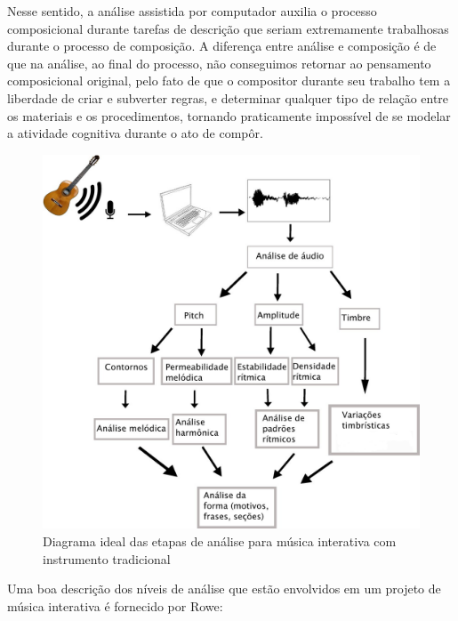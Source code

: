 \documentclass{ppgmus}
\begin{document}

Nesse sentido, a análise assistida por computador auxilia
o processo composicional durante tarefas de descrição que seriam
extremamente trabalhosas durante o processo de composição.
A diferença entre análise e composição é de que na análise, ao final do
processo, não conseguimos retornar ao pensamento composicional
original, pelo fato de que o compositor durante seu trabalho tem a 
liberdade de criar e subverter regras, e determinar qualquer tipo de relação
entre os materiais e os procedimentos, tornando praticamente impossível
de se modelar a atividade cognitiva durante o ato de compôr.

\begin{figure}
\includegraphics[scale=.9]{analise}
\caption{Diagrama ideal das etapas de análise para música interativa com instrumento tradicional}
\label{analise-geral}
\end{figure} 

Uma boa descrição dos níveis de análise que estão envolvidos em um projeto
de música interativa é fornecido por Rowe:
\end{document}
